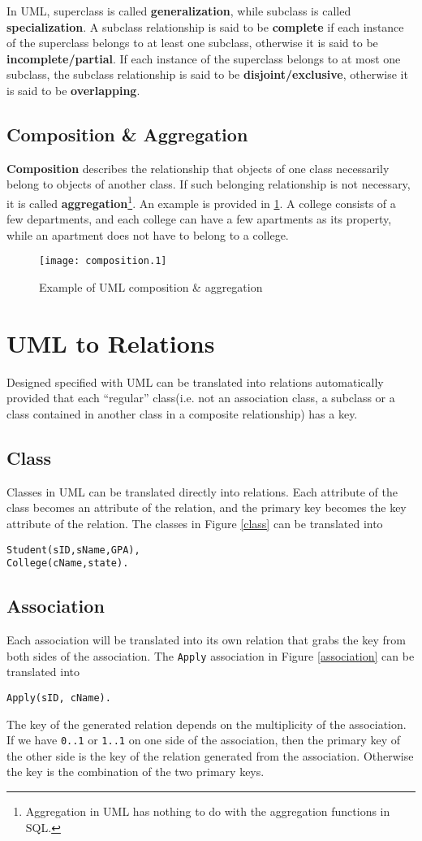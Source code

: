In UML, superclass is called \textbf{generalization}, while subclass is called \textbf{specialization}. A subclass relationship is said to be \textbf{complete} if each instance of the superclass belongs to at least one subclass, otherwise it is said to be \textbf{incomplete/partial}. If each instance of the superclass belongs to at most one subclass, the subclass relationship is said to be \textbf{disjoint/exclusive}, otherwise it is said to be \textbf{overlapping}.
\subsection{Composition \& Aggregation}
\textbf{Composition} describes the relationship that objects of one class necessarily belong to objects of another class. If such belonging relationship is not necessary, it is called \textbf{aggregation}\footnote{Aggregation in UML has nothing to do with the aggregation functions in SQL.}. An example is provided in \ref{composition}. A college consists of a few departments, and each college can have a few apartments as its property, while an apartment does not have to belong to a college.
\begin{figure}[ht]
\centering
\texttt{[image: composition.1]}
\caption{Example of UML composition \& aggregation}\label{composition}
\end{figure}
\section{UML to Relations}
Designed specified with UML can be translated into relations automatically provided that each ``regular'' class(i.e. not an association class, a subclass or a class contained in another class in a composite relationship) has a key. 
\subsection{Class}
Classes in UML can be translated directly into relations. Each attribute of the class becomes an attribute of the relation, and the primary key becomes the key attribute of the relation. The classes in Figure \ref{class} can be translated into 
\begin{lstlisting}
Student(sID,sName,GPA),
College(cName,state).
\end{lstlisting}
\subsection{Association}
Each association will be translated into its own relation that grabs the key from both sides of the association. The \texttt{Apply} association in Figure \ref{association} can be translated into 
\begin{lstlisting}
Apply(sID, cName).
\end{lstlisting}
The key of the generated relation depends on the multiplicity of the association. If we have \texttt{0..1} or \texttt{1..1} on one side of the association, then the primary key of the other side is the key of the relation generated from the association. Otherwise the key is the combination of the two primary keys.

